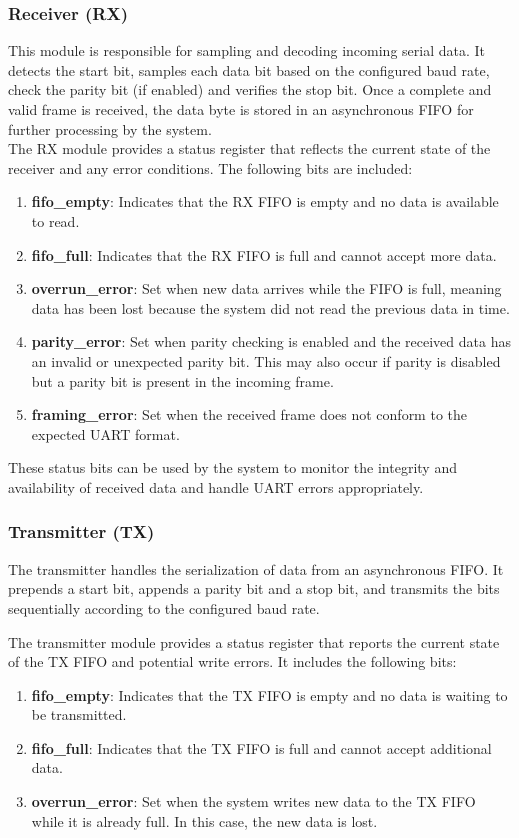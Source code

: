 \documentclass[12pt]{article}
\begin{document}
\subsubsection{Receiver (RX)}
This module is responsible for sampling and decoding incoming serial data. It 
detects the start bit, samples each data bit based on the configured baud rate, 
check the parity bit (if enabled) and verifies the stop bit. Once a complete and valid frame 
is received, the data byte is stored in an asynchronous FIFO for further 
processing by the system. \\

\noindent The RX module provides a status register that reflects the current state of the receiver and 
any error conditions. The following bits are included:
\begin{enumerate}
\item \textbf{fifo\_empty}: Indicates that the RX FIFO is empty and no data is available to 
      read.
\item \textbf{fifo\_full}: Indicates that the RX FIFO is full and cannot accept more data.
\item \textbf{overrun\_error}: Set when new data arrives while the FIFO is full, meaning data 
      has been lost because the system did not read the previous data in time.
\item \textbf{parity\_error}: Set when parity checking is enabled and the received data has an 
      invalid or unexpected parity bit. This may also occur if parity is disabled but a 
      parity bit is present in the incoming frame.
\item \textbf{framing\_error}: Set when the received frame does not conform to the expected 
      UART format.
\end{enumerate}
These status bits can be used by the system to monitor the integrity and availability of received data and handle UART errors appropriately.

\subsubsection{Transmitter (TX)}
The transmitter handles the serialization of data from an asynchronous FIFO. 
It prepends a start bit, appends a parity bit and a stop bit, and transmits the 
bits sequentially according to the configured baud rate.

\noindent The transmitter module provides a status register that reports the current state 
of the TX FIFO and potential write errors. It includes the following bits:
\begin{enumerate}
\item \textbf{fifo\_empty}: Indicates that the TX FIFO is empty and no data is waiting to be 
      transmitted.
\item \textbf{fifo\_full}: Indicates that the TX FIFO is full and cannot accept additional 
      data.
\item \textbf{overrun\_error}: Set when the system writes new data to the TX FIFO while it 
      is already full. In this case, the new data is lost.
\end{enumerate}
\end{document}
